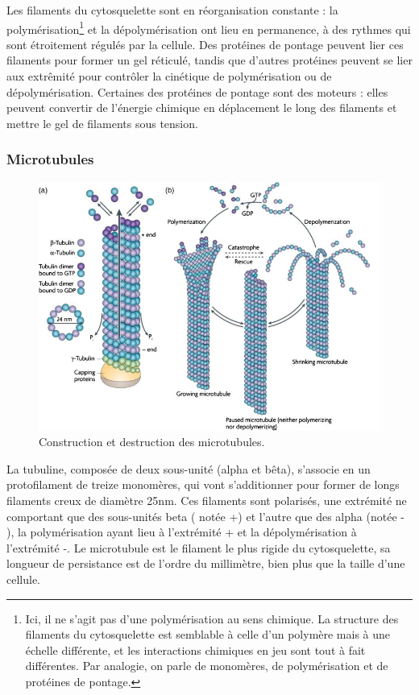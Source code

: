 Les filaments du cytosquelette sont en réorganisation constante : la polymérisation\footnote{Ici, il ne s'agit pas d'une polymérisation au sens chimique. La structure des filaments du cytosquelette est semblable à celle d'un polymère mais à une échelle différente, et les interactions chimiques en jeu sont tout à fait différentes. Par analogie, on parle de monomères, de polymérisation et de protéines de pontage.} et la dépolymérisation ont lieu en permanence, à des rythmes qui sont étroitement régulés par la cellule. 
Des protéines de pontage peuvent lier ces filaments pour former un gel réticulé, tandis que d'autres protéines peuvent se lier aux extrêmité pour contrôler la cinétique de polymérisation ou de dépolymérisation. Certaines des protéines de pontage sont des moteurs : elles peuvent convertir de l'énergie chimique en déplacement le long des filaments et mettre le gel de filaments sous tension. 

\subsubsection{Microtubules}

\begin{figure}
\includegraphics[scale=0.5]{Microtubule.png}
\caption{Construction et destruction des microtubules. }
\end{figure}
La tubuline, composée de deux sous-unité (alpha et bêta), s'associe en un protofilament de treize monomères, qui vont s'additionner pour former de longs filaments creux de diamètre 25nm. Ces filaments sont polarisés, une extrémité ne comportant que des sous-unités beta ( notée +) et l'autre que des alpha (notée - ), la polymérisation ayant lieu à l'extrémité + et la dépolymérisation à l'extrémité -. 
Le microtubule est le filament le plus rigide du cytosquelette, sa longueur de persistance est de l'ordre du millimètre, bien plus que la taille d'une cellule. 

